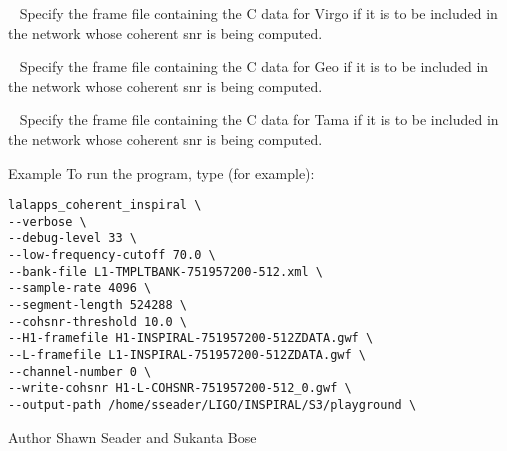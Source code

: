 \begin{entry}
\begin{entry}
\item[\option{--V-framefile}~\parm{FILE}] Specify the frame file containing
the C data for Virgo if it is to be included in the network whose coherent snr
is being computed.

\item[\option{--G-framefile}~\parm{FILE}] Specify the frame file containing
the C data for Geo if it is to be included in the network whose coherent snr
is being computed.

\item[\option{--T-framefile}~\parm{FILE}] Specify the frame file containing
the C data for Tama if it is to be included in the network whose coherent snr
is being computed.

\end{entry}

\item[Example]
To run the program, type (for example):
\begin{verbatim}
lalapps_coherent_inspiral \
--verbose \
--debug-level 33 \ 
--low-frequency-cutoff 70.0 \
--bank-file L1-TMPLTBANK-751957200-512.xml \
--sample-rate 4096 \
--segment-length 524288 \
--cohsnr-threshold 10.0 \
--H1-framefile H1-INSPIRAL-751957200-512ZDATA.gwf \
--L-framefile L1-INSPIRAL-751957200-512ZDATA.gwf \
--channel-number 0 \
--write-cohsnr H1-L-COHSNR-751957200-512_0.gwf \
--output-path /home/sseader/LIGO/INSPIRAL/S3/playground \
\end{verbatim} 


\item[Author] Shawn Seader and Sukanta Bose
\end{entry}
